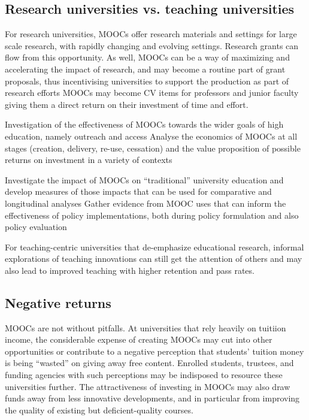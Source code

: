 \subsection{Research universities vs. teaching universities}


For
research universities, MOOCs offer research
materials and settings for large scale research, with rapidly changing
and evolving settings. Research grants can flow from this opportunity.
As well, MOOCs can be a way of maximizing and accelerating the impact of
research, and may become a routine part of grant proposals, thus
incentivising universities to support the production as part of research
efforts MOOCs may become CV items for professors and junior faculty
giving them a direct return on their investment of time and effort.

Investigation of the effectiveness of
MOOCs towards the wider goals of high education, namely outreach and
access Analyse the economics of MOOCs at all stages (creation, delivery,
re-use, cessation) and the value proposition of possible returns on
investment in a variety of contexts 

Investigate the impact of MOOCs on
``traditional'' university education and develop measures of those impacts
that can be used for comparative and longitudinal analyses Gather
evidence from MOOC uses that can inform the effectiveness of policy
implementations, both during policy formulation and also policy
evaluation


For teaching-centric universities that de-emphasize  educational research,
informal explorations of teaching innovations can still get the attention of
others and may also lead to improved
teaching with higher retention and pass rates.

\subsection{Negative returns}

MOOCs are not without pitfalls.
At universities that rely heavily on tuitiion income, the considerable
expense of creating MOOCs may cut into other opportunities or
contribute to a negative perception that students' tuition money is
being ``wasted'' on giving away free content.
Enrolled students, trustees, and funding agencies with such perceptions
may be indisposed to resource these universities further.
The attractiveness of investing in MOOCs may also draw funds away from less
innovative developments, and in particular from improving the quality of
existing but deficient-quality courses.
 
